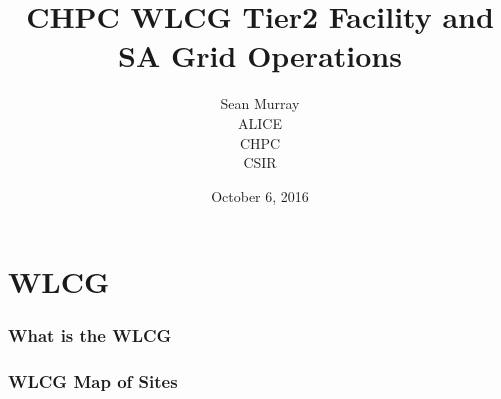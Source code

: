 \documentclass{beamer}
\title{CHPC WLCG Tier2 Facility and SA Grid Operations}
\author{Sean Murray \\
    ALICE \\
    CHPC \\
    CSIR 
}
\date{October 6, 2016}
\begin{document}
\begin{frame}
\titlepage
\end{frame}

\section{WLCG}

\begin{frame}
\frametitle{What is the WLCG}
\end{frame}
\begin{frame}
\frametitle{WLCG Map of Sites}
\end{frame}
\end{document}
